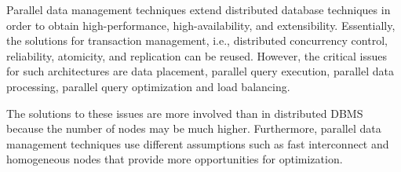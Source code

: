 \documentclass{vldb}
\begin{document}
Parallel data management techniques extend distributed database techniques in order to obtain high-performance, high-availability, and extensibility. Essentially, the solutions for transaction management, i.e., distributed concurrency control, reliability, atomicity, and replication can be reused. However, the critical issues for such architectures are data placement, parallel query execution, parallel data processing, parallel query optimization and load balancing. 

The solutions to these issues are more involved than in distributed DBMS because the number of nodes may be much higher. Furthermore, parallel data management techniques use different assumptions such as fast interconnect and homogeneous nodes that provide more opportunities for optimization.



\end{document}
